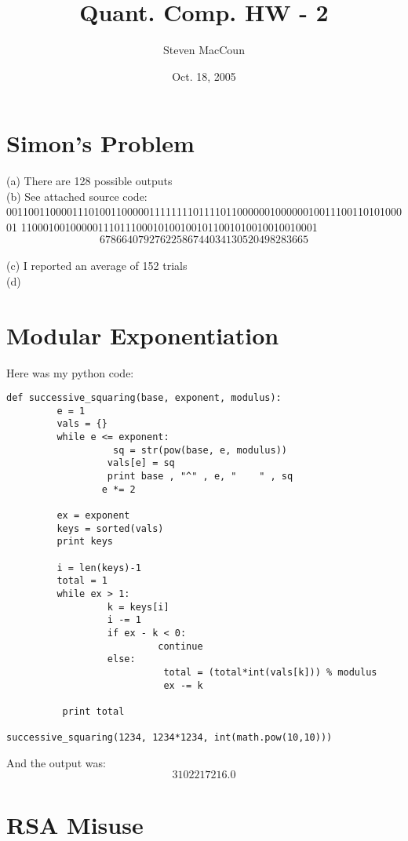 \documentclass[12pt]{article}
\title{Quant. Comp. HW - 2}
\author{Steven MacCoun}
\date{Oct. 18, 2005}
\begin{document}
\maketitle						%



\section{Simon's Problem}

(a) There are 128 possible outputs
\\(b) See attached source code: \\00110011000011101001100000111111110111101100000010000001001110011010100001
110001001000001110111000101001001011001010010010010001
\[
\boxed{67866407927622586744034130520498283665}
\]
\\(c) I reported an average of 152 trials
\\(d) 

\section{Modular Exponentiation}

Here was my python code:

\begin{verbatim}
def successive_squaring(base, exponent, modulus):
         e = 1
         vals = {}
         while e <= exponent:
                   sq = str(pow(base, e, modulus))
                  vals[e] = sq
                  print base , "^" , e, "    " , sq
                 e *= 2

         ex = exponent
         keys = sorted(vals)
         print keys
	
         i = len(keys)-1
         total = 1
         while ex > 1:
                  k = keys[i]
                  i -= 1
                  if ex - k < 0:
                           continue
                  else:
                            total = (total*int(vals[k])) % modulus
                            ex -= k

          print total

successive_squaring(1234, 1234*1234, int(math.pow(10,10)))
\end{verbatim}
And the output was: \[\boxed{3102217216.0}\] 


\section{RSA Misuse}
\end{document}
